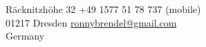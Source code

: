 \color{header-blue}

	\section*{\Huge \name}

	R\"acknitzh\"ohe 32 \hfill +49 1577 51 78 737 (mobile)\\
	01217 Dresden \hfill \href{mailto:ronnybrendel@gmail.com}{ronnybrendel@gmail.com}\\
	Germany \hfill

\color{black}

\vspace{0.6cm}
